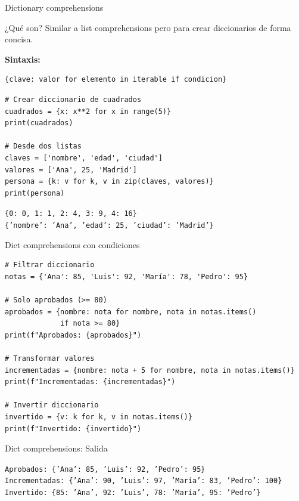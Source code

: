 \documentclass{beamer}
\begin{document}
\begin{frame}[fragile]{Dictionary comprehensions \faBook}
\begin{conceptbox}{¿Qué son?}
Similar a list comprehensions pero para crear diccionarios de forma concisa.
\end{conceptbox}

\textbf{Sintaxis:}
\begin{lstlisting}
{clave: valor for elemento in iterable if condicion}
\end{lstlisting}

\vspace{0.2cm}
\begin{lstlisting}
# Crear diccionario de cuadrados
cuadrados = {x: x**2 for x in range(5)}
print(cuadrados)

# Desde dos listas
claves = ['nombre', 'edad', 'ciudad']
valores = ['Ana', 25, 'Madrid']
persona = {k: v for k, v in zip(claves, valores)}
print(persona)
\end{lstlisting}

\vspace{-0.2cm}
\begin{tcolorbox}[colback=green!10,colframe=green,title={\small\faArrowCircleRight \ Salida},coltitle=fg0,left=3pt,right=3pt,top=2pt,bottom=2pt,boxsep=1pt]
\small\texttt{\{0: 0, 1: 1, 2: 4, 3: 9, 4: 16\}\\
\{'nombre': 'Ana', 'edad': 25, 'ciudad': 'Madrid'\}}
\end{tcolorbox}
\end{frame}

\begin{frame}[fragile]{Dict comprehensions con condiciones \faFilter}
\begin{lstlisting}
# Filtrar diccionario
notas = {'Ana': 85, 'Luis': 92, 'María': 78, 'Pedro': 95}

# Solo aprobados (>= 80)
aprobados = {nombre: nota for nombre, nota in notas.items() 
             if nota >= 80}
print(f"Aprobados: {aprobados}")

# Transformar valores
incrementadas = {nombre: nota + 5 for nombre, nota in notas.items()}
print(f"Incrementadas: {incrementadas}")

# Invertir diccionario
invertido = {v: k for k, v in notas.items()}
print(f"Invertido: {invertido}")
\end{lstlisting}
\end{frame}

\begin{frame}[fragile]{Dict comprehensions: Salida \faArrowCircleRight}
\begin{tcolorbox}[colback=green!10,colframe=green,title={\small\faArrowCircleRight \ Salida},coltitle=fg0,left=3pt,right=3pt,top=2pt,bottom=2pt,boxsep=1pt]
\small\texttt{Aprobados: \{'Ana': 85, 'Luis': 92, 'Pedro': 95\}\\
Incrementadas: \{'Ana': 90, 'Luis': 97, 'María': 83, 'Pedro': 100\}\\
Invertido: \{85: 'Ana', 92: 'Luis', 78: 'María', 95: 'Pedro'\}}
\end{tcolorbox}
\end{frame}
\end{document}
